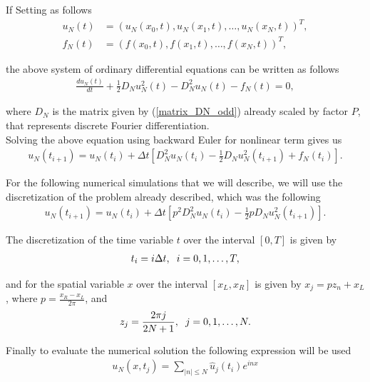	If Setting as follows
	\begin{align*}
		u_N (t) &= (u_N (x_0 , t), u_N (x_1 , t), \dots , u_N (x_{N} , t))^T, \\
		f_N(t) &= (f(x_0 , t), f(x_1 , t), \dots , f(x_{N} , t))^T,
	\end{align*} 
	
	the above system of ordinary differential equations can be written as follows
	\begin{align*}
		\frac{d u_N (t)}{dt} + \frac{1}{2} D_N u^2_N (t) - D_N^2 u_N (t) - f_N (t) = 0,
	\end{align*}
	
	where $D_N$ is the matrix given by (\ref{matrix_DN_odd}) already scaled by factor $P$, that represents discrete Fourier differentiation. \\
	
	Solving the above equation using backward Euler for nonlinear term gives us
	\begin{align}
		u_N (t_{i + 1} ) = u_N (t_i) + \Delta t \left[ D_N^2 u_N (t_i) - \frac{1}{2} D_N u^2_N (t_{i+1}) + f_N (t_i) \right].
	\end{align}
	
	For the following numerical simulations that we will describe, we will use the discretization of the problem already described, which was the following
	\begin{align}
		\label{Collocation_full_discrete}
		u_N (t_{i + 1} ) = u_N (t_i) + \Delta t \left[p^2 D_N^2 u_N (t_i) - \frac{1}{2} p D_N u^2_N (t_{i+1}) \right].
	\end{align}
	
	The discretization of the time variable $t$ over the interval $[0, T]$ is given by
	\begin{align*}
		t_i = i \Delta t, \hspace{2mm} i = 0, 1, \dots, T,
	\end{align*} 
	
	and for the spatial variable $x$ over the interval $[x_L, x_R]$ is given by $x_j = p z_n + x_L$, where $p = \frac{x_R - x_L}{2 \pi}$, and  
	\begin{align*}
		z_j = \frac{2 \pi j}{2N + 1}, \hspace{2mm} j = 0, 1, \dots, N.
	\end{align*}
	
	Finally to evaluate the numerical solution the following expression will be used
	\begin{align*}
		u_N(x, t_j) = \displaystyle \sum_{|n| \leq N} \hat{u}_j (t_i) e^{inx}
	\end{align*}
	
